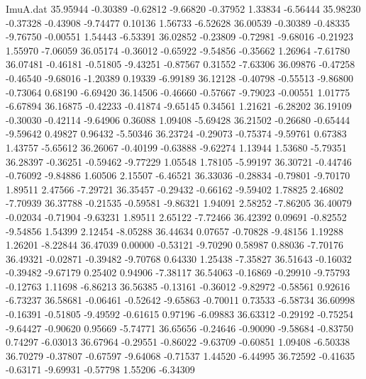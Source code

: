 \begin{filecontents}{ImuA.dat}
  35.95944   -0.30389   -0.62812   -9.66820   -0.37952    1.33834   -6.56444
  35.98230   -0.37328   -0.43908   -9.74477    0.10136    1.56733   -6.52628
  36.00539   -0.30389   -0.48335   -9.76750   -0.00551    1.54443   -6.53391
  36.02852   -0.23809   -0.72981   -9.68016   -0.21923    1.55970   -7.06059
  36.05174   -0.36012   -0.65922   -9.54856   -0.35662    1.26964   -7.61780
  36.07481   -0.46181   -0.51805   -9.43251   -0.87567    0.31552   -7.63306
  36.09876   -0.47258   -0.46540   -9.68016   -1.20389    0.19339   -6.99189
  36.12128   -0.40798   -0.55513   -9.86800   -0.73064    0.68190   -6.69420
  36.14506   -0.46660   -0.57667   -9.79023   -0.00551    1.01775   -6.67894
  36.16875   -0.42233   -0.41874   -9.65145    0.34561    1.21621   -6.28202
  36.19109   -0.30030   -0.42114   -9.64906    0.36088    1.09408   -5.69428
  36.21502   -0.26680   -0.65444   -9.59642    0.49827    0.96432   -5.50346
  36.23724   -0.29073   -0.75374   -9.59761    0.67383    1.43757   -5.65612
  36.26067   -0.40199   -0.63888   -9.62274    1.13944    1.53680   -5.79351
  36.28397   -0.36251   -0.59462   -9.77229    1.05548    1.78105   -5.99197
  36.30721   -0.44746   -0.76092   -9.84886    1.60506    2.15507   -6.46521
  36.33036   -0.28834   -0.79801   -9.70170    1.89511    2.47566   -7.29721
  36.35457   -0.29432   -0.66162   -9.59402    1.78825    2.46802   -7.70939
  36.37788   -0.21535   -0.59581   -9.86321    1.94091    2.58252   -7.86205
  36.40079   -0.02034   -0.71904   -9.63231    1.89511    2.65122   -7.72466
  36.42392    0.09691   -0.82552   -9.54856    1.54399    2.12454   -8.05288
  36.44634    0.07657   -0.70828   -9.48156    1.19288    1.26201   -8.22844
  36.47039    0.00000   -0.53121   -9.70290    0.58987    0.88036   -7.70176
  36.49321   -0.02871   -0.39482   -9.70768    0.64330    1.25438   -7.35827
  36.51643   -0.16032   -0.39482   -9.67179    0.25402    0.94906   -7.38117
  36.54063   -0.16869   -0.29910   -9.75793   -0.12763    1.11698   -6.86213
  36.56385   -0.13161   -0.36012   -9.82972   -0.58561    0.92616   -6.73237
  36.58681   -0.06461   -0.52642   -9.65863   -0.70011    0.73533   -6.58734
  36.60998   -0.16391   -0.51805   -9.49592   -0.61615    0.97196   -6.09883
  36.63312   -0.29192   -0.75254   -9.64427   -0.90620    0.95669   -5.74771
  36.65656   -0.24646   -0.90090   -9.58684   -0.83750    0.74297   -6.03013
  36.67964   -0.29551   -0.86022   -9.63709   -0.60851    1.09408   -6.50338
  36.70279   -0.37807   -0.67597   -9.64068   -0.71537    1.44520   -6.44995
  36.72592   -0.41635   -0.63171   -9.69931   -0.57798    1.55206   -6.34309

\end{filecontents}

